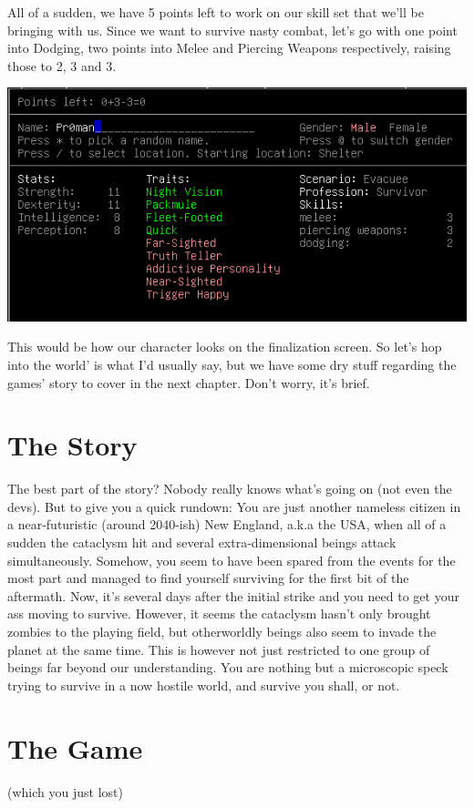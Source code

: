 \documentclass[11pt]{report}
\begin{document}
All of a sudden, we have 5 points left to work on our skill set that we'll be bringing with us. Since we want to survive nasty combat, let's go with one point into Dodging, two points into Melee and Piercing Weapons respectively, raising those to 2, 3 and 3.

\includegraphics{02}

This would be how our character looks on the finalization screen. So let's hop into the world' is what I'd usually say, but we have some dry stuff regarding the games' story to cover in the next chapter. Don't worry, it's brief.

\chapter{The Story}

The best part of the story? Nobody really knows what's going on (not even the devs). But to give you a quick rundown: You are just another nameless citizen in a near-futuristic (around 2040-ish) New England, a.k.a the USA, when all of a sudden the cataclysm hit and several extra-dimensional beings attack simultaneously. Somehow, you seem to have been spared from the events for the most part and managed to find yourself surviving for the first bit of the aftermath. Now, it's several days after the initial strike and you need to get your ass moving to survive. However, it seems the cataclysm hasn't only brought zombies to the playing field, but otherworldly beings also seem to invade the planet at the same time. This is however not just restricted to one group of beings far beyond our understanding. You are nothing but a microscopic speck trying to survive in a now hostile world, and survive you shall, or not.

\chapter{The Game}
(which you just lost)
\end{document}

